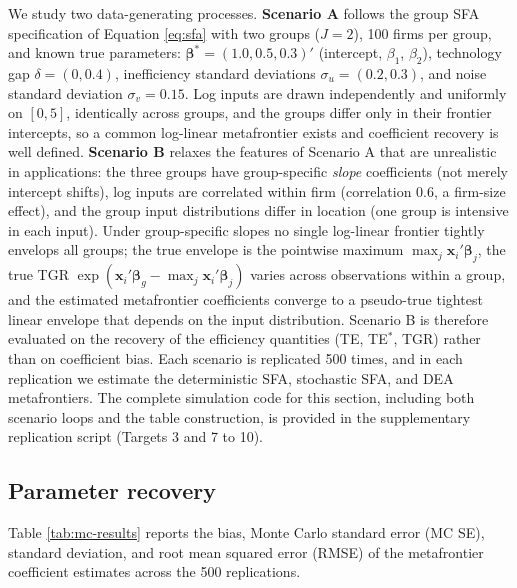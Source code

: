 We study two data-generating processes. \textbf{Scenario A} follows the group
SFA specification of Equation \eqref{eq:sfa} with two groups (\(J = 2\)), 100 firms per
group, and known true parameters:
\(\boldsymbol{\beta}^* = (1.0, 0.5, 0.3)'\) (intercept, \(\beta_1\), \(\beta_2\)),
technology gap \(\delta = (0, 0.4)\), inefficiency standard deviations
\(\sigma_u = (0.2, 0.3)\), and noise standard deviation \(\sigma_v = 0.15\).
Log inputs are drawn independently and uniformly on \([0, 5]\), identically
across groups, and the groups differ only in their frontier intercepts, so
a common log-linear metafrontier exists and coefficient recovery is well
defined. \textbf{Scenario B} relaxes the features of Scenario A that are
unrealistic in applications: the three groups have group-specific \emph{slope}
coefficients (not merely intercept shifts), log inputs are correlated
within firm (correlation 0.6, a firm-size effect), and the group input
distributions differ in location (one group is intensive in each input).
Under group-specific slopes no single log-linear frontier tightly envelops
all groups; the true envelope is the pointwise maximum
\(\max_j \mathbf{x}_i'\boldsymbol{\beta}_j\), the true TGR
\(\exp(\mathbf{x}_i'\boldsymbol{\beta}_g - \max_j
\mathbf{x}_i'\boldsymbol{\beta}_j)\) varies across observations within a
group, and the estimated metafrontier coefficients converge to a
pseudo-true tightest linear envelope that depends on the input
distribution. Scenario B is therefore evaluated on the recovery of the
efficiency quantities (TE, TE\(^*\), TGR) rather than on coefficient bias.
Each scenario is replicated 500 times, and in each replication we estimate
the deterministic SFA, stochastic SFA, and DEA metafrontiers. The complete
simulation code for this section, including both scenario loops and the
table construction, is provided in the supplementary replication script
(Targets 3 and 7 to 10).

\subsection{Parameter recovery}\label{sec:parameter-recovery}

Table \ref{tab:mc-results} reports the bias, Monte Carlo standard error
(MC SE), standard deviation, and root mean squared error (RMSE) of the
metafrontier coefficient estimates across the 500 replications.

